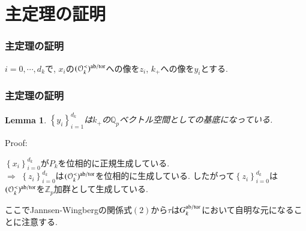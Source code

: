 \documentclass[dvipdfmx,19.8pt]{beamer}
\newcommand{\Blue}{\color{blue}}
\theoremstyle{theorem}
\newtheorem{lem}[theorem]{Lemma}
\theoremstyle{definition}
\def\bZ{{\mathbb Z}}
\def\bQ{{\mathbb Q}}
\def\CalO{{\mathcal O}}
\begin{document}
\section{主定理の証明}



\begin{frame}[fragile]
	\frametitle{主定理の証明}

\begin{definition}
$i=0, \cdots, d_k$で, $x_i$の$(\CalO_k^{\prec})^{\rm ab/tor}$への像を$z_i$, $k_+$への像を$y_i$とする.  

\begin{center}
\end{center}
\end{definition}


\end{frame}






\begin{frame}[fragile]
	\frametitle{主定理の証明}
\begin{lem}
$\left\{y_i \right\}_{i=1}^{d_k}$は$k_+$の$\bQ_p$ベクトル空間としての基底になっている. 
\end{lem}
{\Blue Proof:}

$\left\{x_i \right\}_{i=0}^{d_k}$が$P_k$を位相的に正規生成している. \\
$\Rightarrow$ $\left\{z_i \right\}_{i=0}^{d_k}$は$(\CalO_k^{\prec})^{\rm ab/tor}$を位相的に生成している. 
したがって$\left\{z_i \right\}_{i=0}^{d_k}$は$(\CalO_k^{\prec})^{\rm ab/tor}$を$\bZ_p$加群として生成している. 


ここでJannsen-Wingbergの関係式$(2)$から$\tau$は$G_k^{\rm ab/tor}$において自明な元になることに注意する. 


\end{frame}
\end{document}

